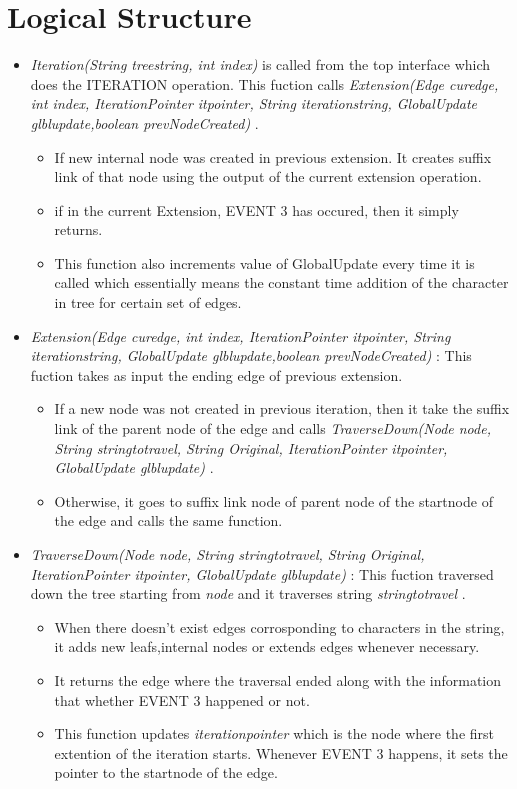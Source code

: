 \documentclass[a4paper]{article}
\begin{document}
\section{Logical Structure}
\begin{itemize}
\item {\it Iteration(String treestring, int index)} is called from the top interface which does the ITERATION operation. This fuction calls {\it Extension(Edge curedge, int index, IterationPointer itpointer, String iterationstring, GlobalUpdate glblupdate,boolean prevNodeCreated)} .
\begin{itemize}
\item If new internal node was created in previous extension. It creates suffix link of that node using the output of the current extension operation.
\item if in the current Extension, EVENT 3 has occured, then it simply returns.
\item This function also increments value of GlobalUpdate every time it is called which essentially means the constant time addition of the character in tree for certain set of edges.
\end{itemize}
\item {\it Extension(Edge curedge, int index, IterationPointer itpointer, String iterationstring, GlobalUpdate glblupdate,boolean prevNodeCreated)} : This fuction takes as input the ending edge of previous extension. 
\begin {itemize}
\item If a new node was not created in previous iteration, then it take the suffix link of the parent node of the edge and calls {\it TraverseDown(Node node, String stringtotravel, String Original, IterationPointer itpointer, GlobalUpdate glblupdate)} . 
\item Otherwise, it goes to suffix link node of parent node of the startnode of the edge and calls the same function.
\end{itemize}
\item {\it TraverseDown(Node node, String stringtotravel, String Original, IterationPointer itpointer, GlobalUpdate glblupdate)} : This fuction traversed down the tree starting from {\it node} and it traverses string {\it stringtotravel} . 
\begin{itemize}
\item When there doesn't exist edges corrosponding to characters in the string, it adds new leafs,internal nodes or extends edges whenever necessary.
\item It returns the edge where the traversal ended along with the information that whether EVENT 3 happened or not.
\item This function updates {\it iterationpointer} which is the node where the first extention of the iteration starts. Whenever EVENT 3 happens, it sets the pointer to the startnode of the edge.
\end{itemize} 
\end{itemize}
\end{document}
